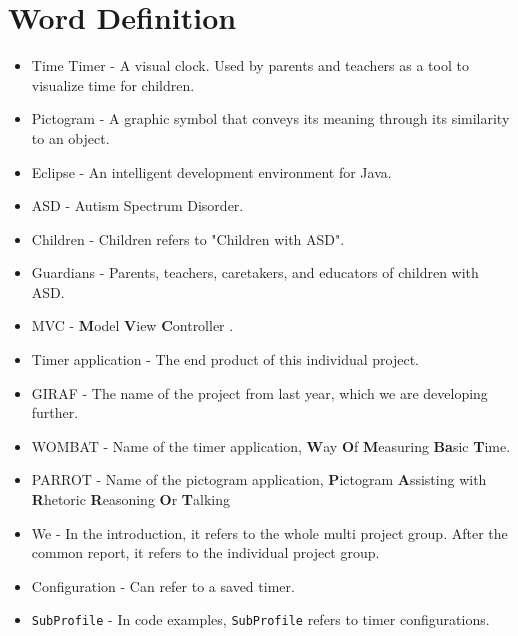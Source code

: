\chapter*{Word Definition}

\begin{itemize}

	\item Time Timer - A visual clock. Used by parents and teachers as a tool to visualize time for children.
	\item Pictogram - A graphic symbol that conveys its meaning through its similarity to an object.
	\item Eclipse - An intelligent development environment for Java.
	\item ASD - Autism Spectrum Disorder.
	\item Children - Children refers to "Children with ASD".
	\item Guardians - Parents, teachers, caretakers, and educators of children with ASD.
	\item MVC - \textbf{M}odel \textbf{V}iew \textbf{C}ontroller \cite{MVC}.
	\item Timer application - The end product of this individual project.
	\item GIRAF - The name of the project from last year, which we are developing further.
	\item WOMBAT - Name of the timer application, \textbf{W}ay \textbf{O}f \textbf{M}easuring \textbf{Ba}sic \textbf{T}ime.
	\item PARROT - Name of the pictogram application, \textbf{P}ictogram \textbf{A}ssisting with \textbf{R}hetoric \textbf{R}easoning \textbf{O}r \textbf{T}alking
	\item We - In the introduction, it refers to the whole multi project group. After the common report, it refers to the individual project group.
	\item Configuration - Can refer to a saved timer.
	\item \texttt{SubProfile} - In code examples, \texttt{SubProfile} refers to timer configurations.

\end{itemize}